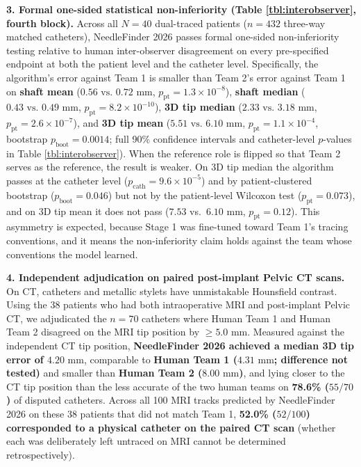 \documentclass[
  11pt,
]{article}
\begin{document}
\textbf{3. Formal one-sided statistical non-inferiority (Table
\ref{tbl:interobserver}, fourth block).} Across all \(N = 40\)
dual-traced patients (\(n = 432\) three-way matched catheters),
NeedleFinder 2026 passes formal one-sided non-inferiority testing
relative to human inter-observer disagreement on every pre-specified
endpoint at both the patient level and the catheter level. Specifically,
the algorithm's error against Team 1 is smaller than Team 2's error
against Team 1 on \textbf{shaft mean}
(\(0.56\text{ vs. }0.72\text{ mm}\),
\(p_{\text{pt}} = 1.3 \times 10^{-8}\)), \textbf{shaft median}
(\(0.43\text{ vs. }0.49\text{ mm}\),
\(p_{\text{pt}} = 8.2 \times 10^{-10}\)), \textbf{3D tip median}
(\(2.33\text{ vs. }3.18\text{ mm}\),
\(p_{\text{pt}} = 2.6 \times 10^{-7}\)), and \textbf{3D tip mean}
(\(5.51\text{ vs. }6.10\text{ mm}\),
\(p_{\text{pt}} = 1.1 \times 10^{-4}\), bootstrap
\(p_{\text{boot}} = 0.0014\); full 90\% confidence intervals and
catheter-level \(p\)-values in Table \ref{tbl:interobserver}). When the
reference role is flipped so that Team 2 serves as the reference, the
result is weaker. On 3D tip median the algorithm passes at the catheter
level (\(p_{\text{cath}} = 9.6 \times 10^{-5}\)) and by
patient-clustered bootstrap (\(p_{\text{boot}} = 0.046\)) but not by the
patient-level Wilcoxon test (\(p_{\text{pt}} = 0.073\)), and on 3D tip
mean it does not pass (\(7.53\) vs.~\(6.10\text{ mm}\),
\(p_{\text{pt}} = 0.12\)). This asymmetry is expected, because Stage 1
was fine-tuned toward Team 1's tracing conventions, and it means the
non-inferiority claim holds against the team whose conventions the model
learned.

\textbf{4. Independent adjudication on paired post-implant Pelvic CT
scans.} On CT, catheters and metallic stylets have unmistakable
Hounsfield contrast. Using the 38 patients who had both intraoperative
MRI and post-implant Pelvic CT, we adjudicated the \(n = 70\) catheters
where Human Team 1 and Human Team 2 disagreed on the MRI tip position by
\(\ge 5.0\text{ mm}\). Measured against the independent CT tip position,
\textbf{NeedleFinder 2026 achieved a median 3D tip error of
\(4.20\text{ mm}\)}, comparable to \textbf{Human Team 1
(\(4.31\text{ mm}\); difference not tested)} and smaller than
\textbf{Human Team 2 (\(8.00\text{ mm}\))}, and lying closer to the CT
tip position than the less accurate of the two human teams on
\textbf{78.6\% (\(55/70\))} of disputed catheters. Across all 100 MRI
tracks predicted by NeedleFinder 2026 on these 38 patients that did not
match Team 1, \textbf{52.0\% (\(52/100\)) corresponded to a physical
catheter on the paired CT scan} (whether each was deliberately left
untraced on MRI cannot be determined retrospectively).
\end{document}
